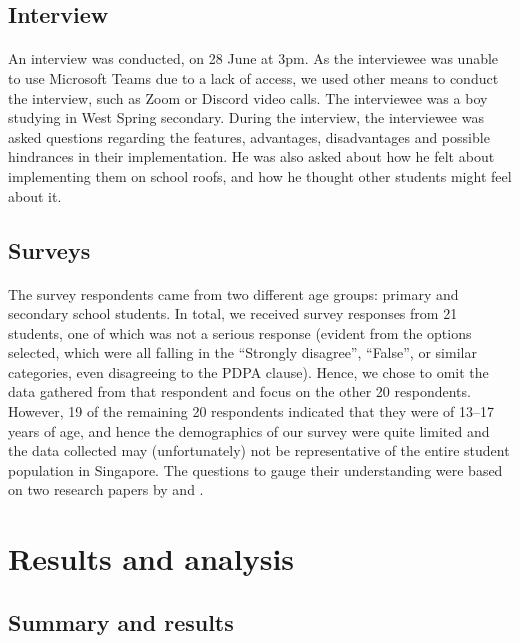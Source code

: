 \documentclass[a4paper]{article}
\begin{document}
\begin{multicols}{2}
  \subsection{Interview}
  \paragraph{} An interview was conducted, on 28 June at 3pm. As
  the interviewee was unable to use Microsoft Teams due to a lack
  of access, we used other means to conduct the interview, such as
  Zoom or Discord video calls. The interviewee was a boy studying in
  West Spring secondary. During the interview, the interviewee was
  asked questions regarding the features, advantages, disadvantages and
  possible hindrances in their implementation. He was also asked about
  how he felt about implementing them on school roofs, and how he thought
  other students might feel about it.

  \subsection{Surveys}
  \paragraph{} The survey respondents came from two different age
  groups: primary and secondary school students. In total, we received
  survey responses from 21 students, one of which was not a serious
  response (evident from the options selected, which were all falling
  in the ``Strongly disagree'', ``False'', or similar categories,
  even disagreeing to the PDPA clause). Hence, we chose to omit
  the data gathered from that respondent and focus on the other 20
  respondents. However, 19 of the remaining 20 respondents indicated that
  they were of 13--17 years of age, and hence the demographics of our
  survey were quite limited and the data collected may (unfortunately) not
  be representative of the entire student population in Singapore. The
  questions to gauge their understanding were based on two research
  papers by \cite{HKGreenRoofGL} and \cite{energeff}.



  \section{Results and analysis}
  \subsection{Summary and results}

\end{multicols}
\end{document}
